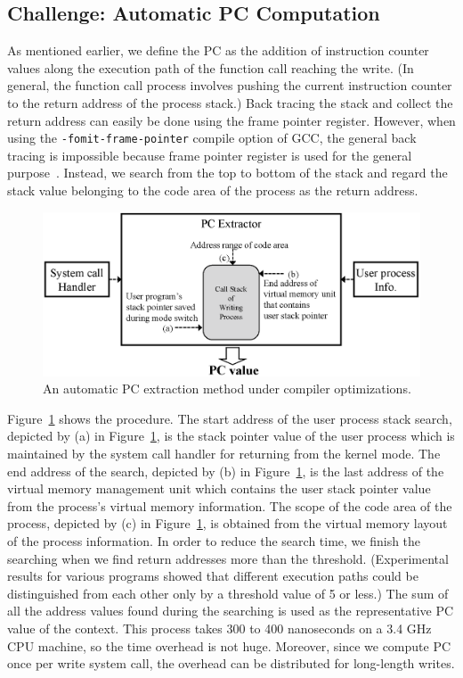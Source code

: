 \subsection{Challenge: Automatic PC Computation}
As mentioned earlier, we define the PC as the addition of instruction counter values along the 
execution path of the function call reaching the write. 
(In general, the function call process involves pushing the current instruction 
counter to the return address of the process stack.) 
Back tracing the stack and collect the return address can easily be done using the frame pointer register. 
However, when using the {\tt -fomit-frame-pointer} compile option of GCC, 
the general back tracing is impossible because frame pointer register is used for the general purpose~\cite{GCC}. 
Instead, we search from the top to bottom of the stack and regard the stack value 
belonging to the code area of the process as the return address. 

\begin{figure}[t]
	\centering
	\includegraphics[width=1\linewidth]{figure/getpc}
	\vspace{-10pt}
	\caption{An automatic PC extraction method under compiler optimizations.}
	\label{fig:getpc}
	\vspace{-20pt}
\end{figure}

Figure~\ref{fig:getpc} shows the procedure. 
The start address of the user process stack search, depicted by (a) in Figure~\ref{fig:getpc},
is the stack pointer value of the user process 
which is maintained by the system call handler for returning from the kernel mode. 
The end address of the search, depicted by (b) in Figure~\ref{fig:getpc},
is the last address of the virtual memory management unit which
contains the user stack pointer value
from the process's virtual memory information. 
The scope of the code area of the process, depicted by (c) in Figure~\ref{fig:getpc},
is obtained from the virtual memory layout of the process information. 
In order to reduce the search time, we finish the searching 
when we find return addresses more than the threshold.
(Experimental results for various programs showed that different execution paths could be distinguished 
from each other only by a threshold value of 5 or less.)
The sum of all the address values found during the searching is used 
as the representative PC value of the context.
This process takes 300 to 400 nanoseconds on a 3.4 GHz CPU machine, 
so the time overhead is not huge.
Moreover, since we compute PC once per write system call,
the overhead can be distributed for long-length writes.


